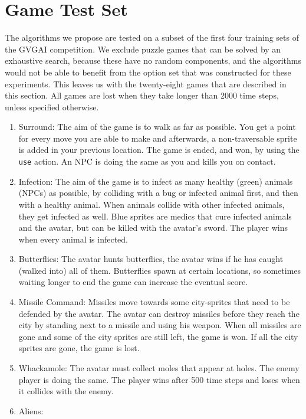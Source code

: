\section{Game Test Set}
\label{subsec:games}
The algorithms we propose are tested on a subset of the first four training sets
of the GVGAI competition. We exclude puzzle games that can be solved by an
exhaustive search, because these have no random components, and the algorithms
would not be able to benefit from the option set that was constructed for these
experiments. This leaves us with the twenty-eight games that are described in this
section. All games are lost when they take longer than 2000 time steps, unless
specified otherwise.

\begin{enumerate}
	\item Surround: 
		The aim of the game is to walk as far as possible. You get a point for
		every move you are able to make and afterwards, a non-traversable sprite
		is added in your previous location. The game is ended, and won, by using
		the \texttt{use} action. An NPC is doing the same as you and kills you
		on contact.
	\item Infection:
		The aim of the game is to infect as many healthy (green) animals (NPCs)
		as possible, by colliding with a bug or infected animal first, and then
		with a healthy animal. When animals collide with other infected animals,
		they get infected as well. Blue sprites are medics that cure infected
		animals and the avatar, but can be killed with the avatar's sword. The
		player wins when every animal is infected.
	\item Butterflies: 
		The avatar hunts butterflies, the avatar wins if he has caught (walked
		into) all of them. Butterflies spawn at certain locations, so sometimes
		waiting longer to end the game can increase the eventual score.
	\item Missile Command: 
		Missiles move towards some city-sprites that need to be defended by the
		avatar. The avatar can destroy missiles before they reach the city by
		standing next to a missile and using his weapon. When all missiles are
		gone and some of the city sprites are still left, the game is won. If
		all the city sprites are gone, the game is lost.
	\item Whackamole:
		The avatar must collect moles that appear at holes. The enemy player is
		doing the same. The player wins after 500 time steps and loses when it
		collides with the enemy.
	\item Aliens:

\end{enumerate}
